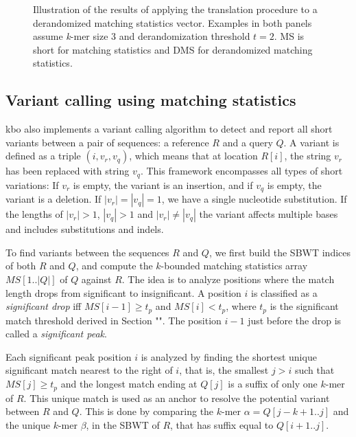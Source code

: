 \documentclass[unnumsec,webpdf,modern,large]{biorxiv}%
\theoremstyle{thmstyleone}%
\theoremstyle{thmstyletwo}%
\theoremstyle{thmstylethree}%
\begin{document}
\begin{figure}[t]
    \centering
    
    {}
    \caption{Illustration of the results of applying the translation procedure to a derandomized matching statistics vector. Examples in both panels assume \emph{k}-mer size 3 and derandomization threshold $t=2$. MS is short for matching statistics and DMS for derandomized matching statistics.}
    \label{fig:translate_cases}
\end{figure}

\subsection{Variant calling using matching statistics}

{\sf kbo} also implements a variant calling algorithm to detect and report all short variants between a pair of sequences: a reference $R$ and  a query $Q$. A variant is defined as a triple $(i, v_r, v_q)$, which means that at location $R[i]$, the string $v_r$ has been replaced with string $v_q$. This framework encompasses all types of short variations: If $v_r$ is empty, the variant is an insertion, and if $v_q$ is empty, the variant is a deletion. If $|v_r| = |v_q| = 1$, we have a single nucleotide substitution. If the lengths of $|v_r|>1$, $|v_q|>1$ and $|v_r| \neq|v_q|$ the variant affects multiple bases and includes substitutions and indels. %

To find variants between the sequences $R$ and $Q$, we first build the SBWT indices of both $R$ and $Q$, and compute the $k$-bounded matching statistics array $MS[1..|Q|]$ of $Q$ against $R$. The idea is to analyze positions where the match length drops from significant to insignificant. A position $i$ is classified as a \emph{significant drop} iff $MS[i-1] \geq t_p$ and $MS[i] < t_p$, where $t_p$ is the significant match threshold derived in Section "". %
The position $i-1$ just before the drop is called a \emph{significant peak}.

Each significant peak position $i$ is analyzed by finding the shortest unique significant match nearest to the right of $i$, that is, the smallest $j > i$ such that $MS[j] \geq t_p$ and the longest match ending at $Q[j]$ is a suffix of only one $k$-mer of $R$. This unique match is used as an anchor to resolve the potential variant between $R$ and $Q$. This is done by comparing the $k$-mer $\alpha = Q[j-k+1..j]$ and the unique $k$-mer $\beta$, in the SBWT of $R$, that has suffix equal to $Q[i+1..j]$.
\end{document}
